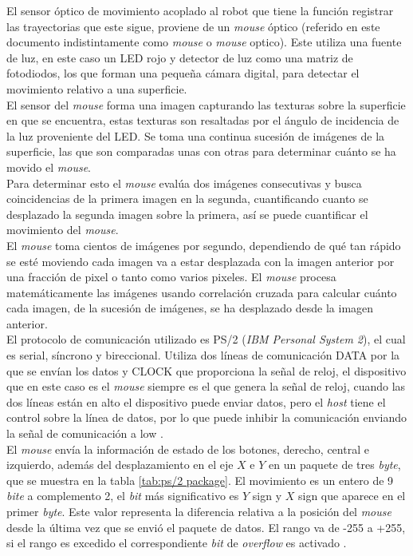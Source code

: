 \documentclass{iccmemoria}
\begin{document}
El sensor óptico de movimiento acoplado al robot que tiene la función registrar las trayectorias que este sigue, proviene de un \emph{mouse} óptico (referido en este documento indistintamente como \emph{mouse} o \emph{mouse} optico). Este utiliza una fuente de luz, en este caso un LED rojo y detector de luz como una matriz de fotodiodos, los que forman una pequeña cámara digital, para detectar el movimiento relativo a una superficie.\\

El sensor del \emph{mouse} forma una imagen capturando las texturas sobre la superficie en que se encuentra, estas texturas son resaltadas por el ángulo de incidencia de la luz proveniente del LED. Se toma una continua sucesión de imágenes de la superficie, las que son comparadas unas con otras para determinar cuánto se ha movido el \emph{mouse}.\\

Para determinar esto el \emph{mouse} evalúa dos imágenes consecutivas y busca coincidencias de la primera imagen en la segunda, cuantificando cuanto se desplazado la segunda imagen sobre la primera, así se puede cuantificar el movimiento del \emph{mouse}.\\

El \emph{mouse} toma cientos de imágenes por segundo, dependiendo de qué tan rápido se esté moviendo cada imagen va a estar desplazada con la imagen anterior por una fracción de pixel o tanto como varios pixeles. El \emph{mouse} procesa matemáticamente las imágenes usando correlación cruzada para calcular cuánto cada imagen, de la sucesión de imágenes, se ha desplazado desde la imagen anterior.\\

El protocolo de comunicación utilizado es PS/2 (\emph{IBM Personal System 2}), el cual es serial, síncrono y bireccional. Utiliza dos líneas de comunicación DATA por la que se envían los datos y CLOCK que proporciona la señal de reloj, el dispositivo que en este caso es el \emph{mouse} siempre es el que genera la señal de reloj, cuando las dos líneas están en alto el dispositivo puede enviar datos, pero el \emph{host} tiene el control sobre la línea de datos, por lo que puede inhibir la comunicación enviando la señal de comunicación a low \cite{ps2protocol}.\\

El \emph{mouse} envía la información de estado de los botones, derecho, central e izquierdo, además del desplazamiento en el eje $X$ e $Y$ en un paquete de tres \emph{byte}, que se muestra en la tabla \ref{tab:ps/2 package}. El movimiento es un entero de 9 \emph{bite} a complemento 2, el \emph{bit} más significativo es $Y$ sign y $X$ sign que aparece en el primer \emph{byte}. Este valor representa la diferencia relativa a la posición del \emph{mouse} desde la última vez que se envió el paquete de datos. El rango va de -255 a +255, si el rango es excedido el correspondiente \emph{bit} de \emph{overflow} es activado \cite{ps2mouse}.\\
\end{document}
